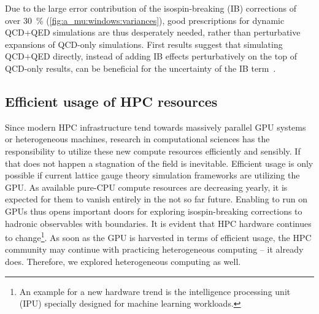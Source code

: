 Due to the large error contribution of the isospin-breaking (IB) corrections of over \SI{30}{\percent} (\cref{fig:a_mu:windows:variances}), good prescriptions for dynamic QCD+QED simulations are thus desperately needed, rather than perturbative expansions of QCD-only simulations.
First results suggest that simulating QCD+QED directly, instead of adding IB effects perturbatively on the top of QCD-only results, can be beneficial for the uncertainty of the IB term~.


\subsection{Efficient usage of HPC resources}

Since modern HPC infrastructure tend towards massively parallel GPU systems or heterogeneous machines, research in computational sciences has the responsibility to utilize these new compute resources efficiently and sensibly.
If that does not happen a stagnation of the field is inevitable.
Efficient usage is only possible if current lattice gauge theory simulation frameworks are utilizing the GPU.
As available pure-CPU compute resources are decreasing yearly, it is expected for them to vanish entirely in the not so far future.
Enabling \openqxd to run on GPUs thus opens important doors for exploring isospin-breaking corrections to hadronic observables with \Cstar boundaries.
It is evident that HPC hardware continues to change\footnote{An example for a new hardware trend is the intelligence processing unit~\cite{ipu} (IPU) specially designed for machine learning workloads.}.
As soon as the GPU is harvested in terms of efficient usage, the HPC community may continue with practicing heterogeneous computing -- it already does.
Therefore, we explored heterogeneous computing as well.

